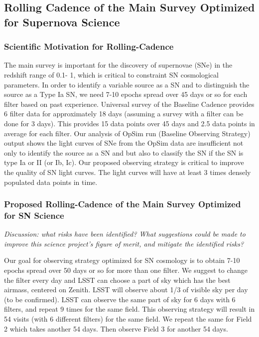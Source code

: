 \subsection{Rolling Cadence of the Main Survey Optimized for Supernova Science}
\subsubsection{ Scientific Motivation for Rolling-Cadence}

The main survey is important for the discovery of supernovae (SNe) in the redshift range of
0.1- 1, which is critical to constraint SN cosmological parameters. In order to identify a
variable source as a SN and to distinguish the source as a Type Ia SN, we need 7-10 epochs
spread over 45 days or so for each filter based on past experience. Universal survey of
the Baseline Cadence provides 6 filter data for approximately 18 days (assuming a survey with
a filter can be done for 3 days). This provides 15 data points over 45 days and 2.5 data
points in average for each filter. Our analysis of OpSim run (Baseline Observing Strategy)
output shows the light curves of SNe from the OpSim data are insufficient not only to
identify the source as a SN and but also to classify the SN if the SN is type Ia or II (or
Ib, Ic). Our proposed observing strategy is critical to improve the quality of SN light
curves. The light curves will have at least 3 times densely populated data points in time. 

\subsubsection{Proposed Rolling-Cadence of the Main Survey Optimized for SN Science }


{\it Discussion: what risks have been identified? What suggestions could be
made to improve this science project's figure of merit, and mitigate
the identified risks?}

Our goal for observing strategy optimized for SN cosmology is to
obtain 7-10 epochs spread over 50 days or so for more than one filter. We suggest to
change the filter every day and LSST can choose a part of sky which has the best airmass,
centered on Zenith. LSST will observe about 1/3 of visible sky per day (to be confirmed).
LSST can observe the same part of sky for 6 days with 6 filters, and repeat 9 times for
the same field. This observing strategy will result in 54 visits (with 6 different
filters) for the same field. We repeat the same for Field 2 which takes another 54 days.
Then observe Field 3 for another 54 days.

